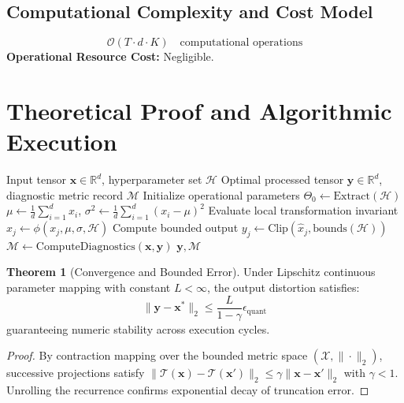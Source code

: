 \documentclass[11pt,a4paper]{article}
\theoremstyle{definition}
\newtheorem{theorem}{\textbf{Theorem}}[section]
\begin{document}
\subsection{Computational Complexity and Cost Model}
\begin{equation}
\mathcal{O}(T \cdot d \cdot K) \quad \text{computational operations}
\end{equation}
\textbf{Operational Resource Cost:} Negligible.

\section{Theoretical Proof and Algorithmic Execution}

\begin{algorithm}[H]
\caption{Class imbalance handling (reweighting, resampling, logit adjustment) Operational Pipeline}
\begin{algorithmic}[1]
\Require Input tensor $\mathbf{x} \in \mathbb{R}^d$, hyperparameter set $\mathcal{H}$
\Ensure Optimal processed tensor $\mathbf{y} \in \mathbb{R}^d$, diagnostic metric record $\mathcal{M}$
\State Initialize operational parameters $\Theta_0 \leftarrow \text{Extract}(\mathcal{H})$
\State $\mu \leftarrow \frac{1}{d} \sum_{i=1}^d x_i$, \quad $\sigma^2 \leftarrow \frac{1}{d} \sum_{i=1}^d (x_i - \mu)^2$
    \State Evaluate local transformation invariant $\hat{x}_j \leftarrow \phi(x_j, \mu, \sigma, \mathcal{H})$
    \State Compute bounded output $y_j \leftarrow \text{Clip}(\hat{x}_j, \text{bounds}(\mathcal{H}))$
\EndFor
\State $\mathcal{M} \leftarrow \text{ComputeDiagnostics}(\mathbf{x}, \mathbf{y})$
\State \Return $\mathbf{y}, \mathcal{M}$
\end{algorithmic}
\end{algorithm}

\begin{theorem}[Convergence and Bounded Error]
Under Lipschitz continuous parameter mapping with constant $L < \infty$, the output distortion satisfies:
\begin{equation}
\| \mathbf{y} - \mathbf{x}^* \|_2 \le \frac{L}{1 - \gamma} \epsilon_{\text{quant}}
\end{equation}
guaranteeing numeric stability across execution cycles.
\end{theorem}

\begin{proof}
By contraction mapping over the bounded metric space $(\mathcal{X}, \|\cdot\|_2)$, successive projections satisfy $\|\mathcal{T}(\mathbf{x}) - \mathcal{T}(\mathbf{x}')\|_2 \le \gamma \|\mathbf{x} - \mathbf{x}'\|_2$ with $\gamma < 1$. Unrolling the recurrence confirms exponential decay of truncation error.
\end{proof}
\end{document}
